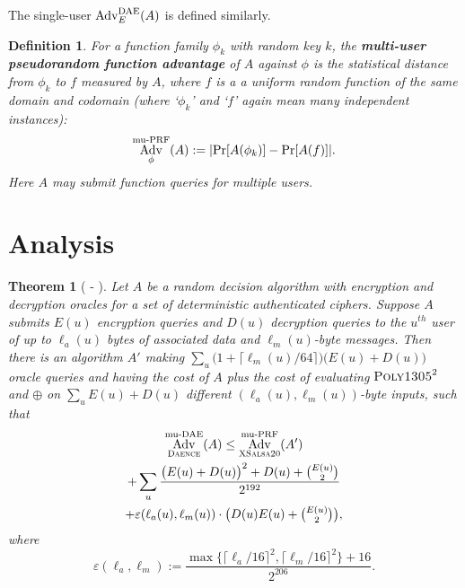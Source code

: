 \documentclass{article}
\newtheorem{definition}{Definition}
\newtheorem{theorem}{Theorem}
\newcommand{\term}[1]{\textbf{#1}}
\def\operatorsc#1{{%
  \ifmmode\let\next=\operatorname\else\let\next=\relax\fi\next{\textsc{#1}}}}
\def\Salsa#1/{\operatorsc{Salsa#1}}
\def\XSalsa#1/{\operatorsc{XSalsa#1}}
\def\Poly#1/{\operatorsc{Poly#1}}
\def\DAENCE/{\operatorsc{Daence}}
\def\muPRF{%
  \ifmmode\def\next{\operatorname{mu-PRF}}%
    \else\def\next/{mu-\textsc{prf}}%
  \fi\next}
\def\DAE{%
  \ifmmode\def\next{\operatorname{DAE}}%
    \else\def\next/{\textsc{dae}}%
  \fi\next}
\def\muDAE{%
  \ifmmode\def\next{\operatorname{mu-DAE}}%
    \else\def\next/{mu-\textsc{dae}}%
  \fi\next}
\DeclareMathOperator{\Adv}{Adv}
\newcommand{\collisionbound}{\varepsilon}
\begin{document}
The single-user $\Adv^{\DAE}_E(A)$ is defined similarly.

\begin{definition}
  For a function family $\phi_k$ with random key $k$, the
   \term{multi-user pseudorandom function advantage}
   of $A$ against $\phi$ is the statistical distance from $\phi_k$ to
   $f$ measured by $A$, where $f$ is a a uniform random function of
   the same domain and codomain (where `$\phi_k$' and `$f$' again
   mean many independent instances):
  \[
    \Adv^{\muPRF}_\phi(A) := \lvert\Pr[A(\phi_k)] - \Pr[A(f)]\rvert.
  \]
  Here $A$ may submit function queries for \emph{multiple} users.
\end{definition}

\section{Analysis}

\begin{theorem}[\Salsa20/-\DAENCE/]\label{salsa20-daence}
  Let $A$ be a random decision algorithm with encryption and
   decryption oracles for a set of deterministic authenticated
   ciphers.
  Suppose $A$ submits $E(u)$ encryption queries and $D(u)$ decryption
   queries to the $u^{\mathit{th}}$ user of up to $\ell_a(u)$ bytes of
   associated data and $\ell_m(u)$-byte messages.
  Then there is an algorithm $A'$ making
   $\sum_u \bigl(1 + \lceil\ell_m(u)/64\rceil\bigr)
     \bigl(E(u) + D(u)\bigr)$
   oracle queries and having the cost of $A$ plus the cost of
   evaluating $\Poly1305/^2$ and $\oplus$ on
   $\sum_u E(u) + D(u)$
   different $(\ell_a(u), \ell_m(u))$-byte inputs,
   such that
%
  \begin{multline*}
    \Adv^{\muDAE}_{\DAENCE/}(A)
     \leq \Adv^{\muPRF}_{\XSalsa20/}(A') \\
            + \sum_u
                \frac{\bigl(E(u) + D(u)\bigr)^2 + D(u) + \binom{E(u)}{2}}
                     {2^{192}} \\
                + \collisionbound(\ell_a(u), \ell_m(u))
                  \cdot
                  {\textstyle\bigl(D(u) E(u) + \binom{E(u)}{2}\bigr)},
  \end{multline*}
%
   where
  \[
    \collisionbound(\ell_a, \ell_m)
    := \frac{\max\{\lceil\ell_a/16\rceil^2, \lceil\ell_m/16\rceil^2\}
             + 16}
            {2^{206}}.
  \]
\end{theorem}
\end{document}
